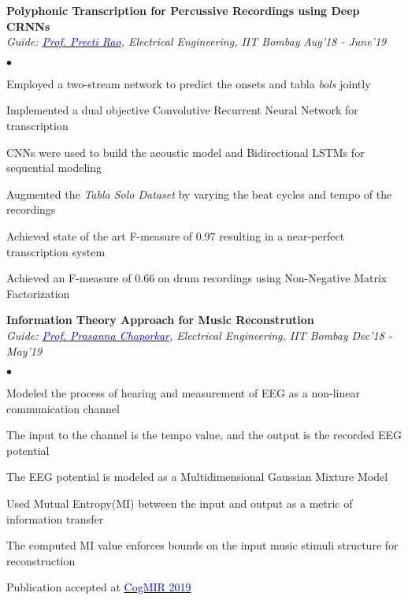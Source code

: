 \documentclass[margin,line, 9pt]{res}
\newenvironment{list2}{
  \begin{list}{$\bullet$}{%
      \setlength{\itemsep}{0.03in}
      \setlength{\parsep}{0in} \setlength{\parskip}{0in}
      \setlength{\topsep}{0in} \setlength{\partopsep}{0in} 
      \setlength{\leftmargin}{0.2in}}}{\end{list}}
\begin{document}
\begin{resume}
{\bf Polyphonic Transcription for Percussive Recordings using Deep CRNNs} \\
{\em Guide: \href{https://www.ee.iitb.ac.in/wiki/faculty/prao}{\textcolor{blue}{Prof. Preeti Rao}}, Electrical Engineering, IIT Bombay} \hfill {\it Aug'18 - June'19}\\
\vspace*{-.13in}
\begin{list2}
\item Employed a two-stream network to predict the onsets and tabla \textit{bols} jointly
\item Implemented a dual objective  Convolutive Recurrent Neural Network for transcription
\item CNNs were used to build the acoustic model and Bidirectional LSTMs for sequential modeling
\item Augmented the \textit{Tabla Solo Dataset} by varying the beat cycles and tempo of the recordings
\item Achieved state of the art F-measure of $0.97$ resulting in a near-perfect transcription system
\item Achieved an F-measure of $0.66$ on drum recordings using Non-Negative Matrix Factorization
\end{list2}

{\bf Information Theory Approach for Music Reconstrution} \\
{\em Guide: \href{https://www.ee.iitb.ac.in/wiki/faculty/chaporkar}{\textcolor{blue}{Prof. Prasanna Chaporkar}}, Electrical Engineering, IIT Bombay} \hfill {\it Dec'18 - May'19}\\
\vspace*{-.13in}
\begin{list2}
\item Modeled the process of hearing and measurement of EEG as a non-linear communication channel
\item The input to the channel is the tempo value, and the output is the recorded EEG potential
\item The EEG potential is modeled as a Multidimensional Gaussian Mixture Model
\item Used Mutual Entropy(MI) between the input and output as a metric of information transfer
\item The computed MI value enforces bounds on the input music stimuli structure for reconstruction
\item Publication accepted at \href{http://www.cogmir.org}{\textcolor{blue} {CogMIR 2019}}
\end{list2}



\end{resume}
\end{document}
